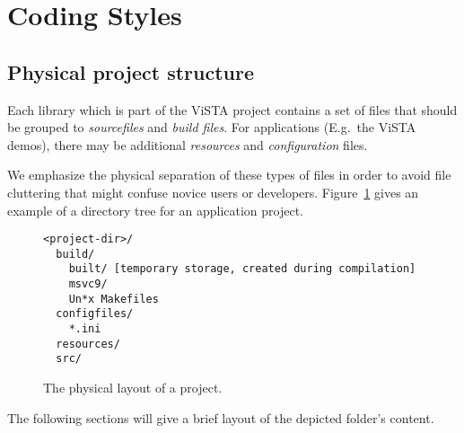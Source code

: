 


\section{Coding Styles}
\label{coding_styles}

\subsection{Physical project structure}
Each library which is part of the ViSTA project contains a set of files that should be grouped to \emph{sourcefiles} and \emph{build files}.
For applications (E.g.\ the ViSTA demos), there may be additional \emph{resources} and \emph{configuration} files.

We emphasize the physical separation of these types of files in order to avoid file cluttering that might confuse novice users or developers.
Figure~\ref{fig:ProjectPhysicalLayout} gives an example of a directory tree for an application project.
\begin{figure}[h]
\begin{verbatim}
<project-dir>/
  build/
    built/ [temporary storage, created during compilation]
    msvc9/
    Un*x Makefiles
  configfiles/
    *.ini
  resources/
  src/
\end{verbatim}
\caption{\label{fig:ProjectPhysicalLayout}The physical layout of a project.}
\end{figure}

The following sections will give a brief layout of the depicted folder's content.

